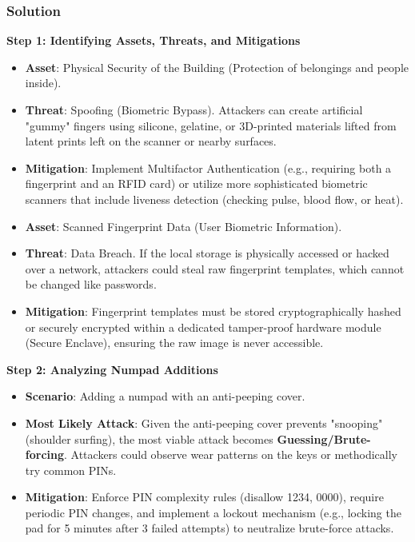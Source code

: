 \documentclass{article}
\begin{document}
\subsubsection*{Solution}
\textbf{Step 1: Identifying Assets, Threats, and Mitigations}
\begin{itemize}
    \item[\textbf{1.}] \textbf{Asset}: Physical Security of the Building (Protection of belongings and people inside).
    \item \textbf{Threat}: Spoofing (Biometric Bypass). Attackers can create artificial "gummy" fingers using silicone, gelatine, or 3D-printed materials lifted from latent prints left on the scanner or nearby surfaces.
    \item \textbf{Mitigation}: Implement Multifactor Authentication (e.g., requiring both a fingerprint and an RFID card) or utilize more sophisticated biometric scanners that include liveness detection (checking pulse, blood flow, or heat).
    \item[\textbf{2.}] \textbf{Asset}: Scanned Fingerprint Data (User Biometric Information).
    \item \textbf{Threat}: Data Breach. If the local storage is physically accessed or hacked over a network, attackers could steal raw fingerprint templates, which cannot be changed like passwords.
    \item \textbf{Mitigation}: Fingerprint templates must be stored cryptographically hashed or securely encrypted within a dedicated tamper-proof hardware module (Secure Enclave), ensuring the raw image is never accessible.

\end{itemize}
\textbf{Step 2: Analyzing Numpad Additions}
\begin{itemize}
    \item \textbf{Scenario}: Adding a numpad with an anti-peeping cover.
    \item \textbf{Most Likely Attack}: Given the anti-peeping cover prevents "snooping" (shoulder surfing), the most viable attack becomes \textbf{Guessing/Brute-forcing}. Attackers could observe wear patterns on the keys or methodically try common PINs.
    \item \textbf{Mitigation}: Enforce PIN complexity rules (disallow 1234, 0000), require periodic PIN changes, and implement a lockout mechanism (e.g., locking the pad for 5 minutes after 3 failed attempts) to neutralize brute-force attacks.
\end{itemize}
\end{document}
